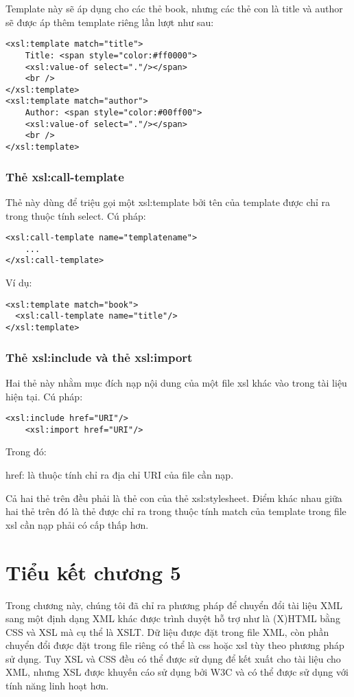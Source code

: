 Template này sẽ áp dụng cho các thẻ {\ttfamily book}, nhưng các thẻ con là {\ttfamily title} và {\ttfamily author} sẽ được áp thêm template riêng lần lượt như sau:
\lstset{language=XML}
\begin{lstlisting}[escapechar=`]
<xsl:template match="title">
	Title: <span style="color:#ff0000">
	<xsl:value-of select="."/></span>
	<br />
</xsl:template>
<xsl:template match="author">
	Author: <span style="color:#00ff00">
	<xsl:value-of select="."/></span>
	<br />
</xsl:template>
\end{lstlisting}
\subsubsection {Thẻ xsl:call-template}
Thẻ này dùng để triệu gọi một {\ttfamily xsl:template} bởi tên của template được chỉ ra trong thuộc tính {\ttfamily select}. Cú pháp:
\lstset{language=XML}
\begin{lstlisting}[escapechar=`]
<xsl:call-template name="templatename">
	...
</xsl:call-template>
\end{lstlisting}
Ví dụ:
\lstset{language=XML}
\begin{lstlisting}[escapechar=`]
<xsl:template match="book">
  <xsl:call-template name="title"/>
</xsl:template>
\end{lstlisting}
\subsubsection {Thẻ xsl:include và thẻ xsl:import}


Hai thẻ này nhằm mục đích nạp nội dung của một file xsl khác vào trong tài liệu hiện tại. Cú pháp:
\lstset{language=XML}
\begin{lstlisting}[escapechar=`]
	<xsl:include href="URI"/>
	<xsl:import href="URI"/>
\end{lstlisting}

Trong đó:

{\ttfamily href}: là thuộc tính chỉ ra địa chỉ URI của file cần nạp.

Cả hai thẻ trên đều phải là thẻ con của thẻ {\ttfamily xsl:stylesheet}. Điểm khác nhau giữa hai thẻ trên đó là thẻ được chỉ ra trong thuộc tính {\ttfamily match} của template trong file xsl cần nạp phải có cấp thấp hơn.

\section{Tiểu kết chương 5}
Trong chương này, chúng tôi đã chỉ ra phương pháp để chuyển đổi tài liệu XML sang một định dạng XML khác được trình duyệt hỗ trợ như là (X)HTML bằng CSS và XSL mà cụ thể là XSLT. Dữ liệu được đặt trong file XML, còn phần chuyển đổi được đặt trong file riêng có thể là css hoặc xsl tùy theo phương pháp sử dụng. Tuy XSL và CSS đều có thể được sử dụng để kết xuất cho tài liệu cho XML, nhưng XSL được khuyến cáo sử dụng bởi W3C và có thể được sử dụng với tính năng linh hoạt hơn.

